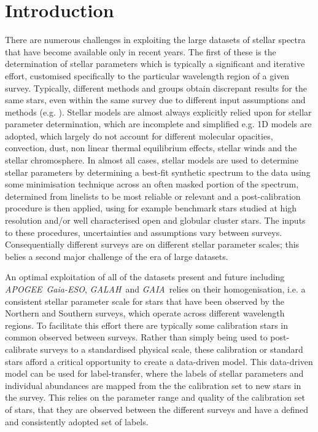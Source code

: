 \documentclass[12pt, preprint]{aastex}
\newcommand{\apogee}{\textsl{APOGEE}}
\newcommand{\galah}{\textsl{GALAH}}
\newcommand{\gaiaeso}{\textsl{Gaia-ESO}}
\newcommand{\gaia}{\textsl{GAIA}}
\begin{document}

\section{Introduction}

There are numerous challenges in exploiting the large datasets of stellar spectra that have become available only in recent years. The first of these is the determination of stellar parameters which is typically a significant and iterative effort, customised specifically to the particular wavelength region of a given survey. Typically, different methods and groups obtain discrepant results for the same stars, even within the same survey due to different input assumptions and methods (e.g. \citep{Sm2014}). Stellar models are almost always explicitly relied upon for stellar parameter determination, which are incomplete and simplified e.g. 1D models are adopted, which  largely do not account for different molecular opacities, convection, dust, non linear thermal equilibrium effects, stellar winds and the stellar chromosphere. In almost all cases, stellar models are used to determine stellar parameters by determining a best-fit synthetic spectrum to the data using some minimisation technique across an often masked portion of the spectrum, determined from linelists to be most reliable or relevant and a post-calibration procedure is then applied, using for example benchmark stars studied at high resolution and/or well characterised open and globular cluster stars. The inputs to these procedures, uncertainties and assumptions vary between surveys. Consequentially different surveys are on different stellar parameter scales; this belies a second major challenge of the era of large datasets. 

An optimal exploitation of all of the datasets present and future including \apogee\, \gaiaeso, \galah\ and \gaia\ relies on their homogenisation, i.e. a consistent stellar parameter scale for stars that have been observed by the Northern and Southern surveys, which operate across different wavelength regions. To facilitate this effort there are typically some calibration stars in common observed between surveys. Rather than simply being used to post-calibrate surveys to a standardised physical scale, these calibration or standard stars afford a critical opportunity to create a data-driven model.  This data-driven model can be used for label-transfer, where the labels of stellar parameters and individual abundances are mapped from the the calibration set to new stars in the survey. This relies on the parameter range and quality of the calibration set of stars, that they are observed between the different surveys and have a defined and consistently adopted set of labels. 
\end{document}
